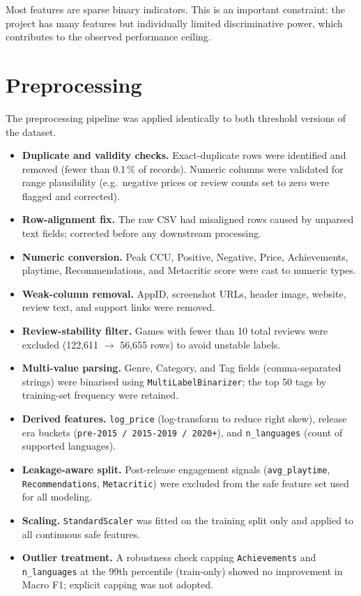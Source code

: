 \documentclass[11pt, a4paper]{article}
\begin{document}
Most features are sparse binary indicators.
This is an important constraint: the project has many features but individually limited
discriminative power, which contributes to the observed performance ceiling.

\section{Preprocessing}
\label{sec:preprocessing}

The preprocessing pipeline was applied identically to both threshold versions of the dataset.

\begin{itemize}
  \item \textbf{Duplicate and validity checks.} Exact-duplicate rows were identified
        and removed (fewer than 0.1\,\% of records).
        Numeric columns were validated for range plausibility
        (e.g.\ negative prices or review counts set to zero were flagged and corrected).
  \item \textbf{Row-alignment fix.} The raw CSV had misaligned rows caused by unparsed
        text fields; corrected before any downstream processing.
  \item \textbf{Numeric conversion.} Peak CCU, Positive, Negative, Price, Achievements,
        playtime, Recommendations, and Metacritic score were cast to numeric types.
  \item \textbf{Weak-column removal.} AppID, screenshot URLs, header image, website,
        review text, and support links were removed.
  \item \textbf{Review-stability filter.} Games with fewer than 10 total reviews were
        excluded (122,611 $\to$ 56,655 rows) to avoid unstable labels.
  \item \textbf{Multi-value parsing.} Genre, Category, and Tag fields (comma-separated
        strings) were binarised using \texttt{MultiLabelBinarizer}; the top 50 tags by
        training-set frequency were retained.
  \item \textbf{Derived features.} \texttt{log\_price} (log-transform to reduce right
        skew), release era buckets (\texttt{pre-2015 / 2015-2019 / 2020+}),
        and \texttt{n\_languages} (count of supported languages).
  \item \textbf{Leakage-aware split.} Post-release engagement signals
        (\texttt{avg\_playtime}, \texttt{Recommendations}, \texttt{Metacritic})
        were excluded from the safe feature set used for all modeling.
  \item \textbf{Scaling.} \texttt{StandardScaler} was fitted on the training split only
        and applied to all continuous safe features.
  \item \textbf{Outlier treatment.} A robustness check capping
        \texttt{Achievements} and \texttt{n\_languages} at the 99th percentile
        (train-only) showed no improvement in Macro F1; explicit capping was not adopted.
\end{itemize}
\end{document}
